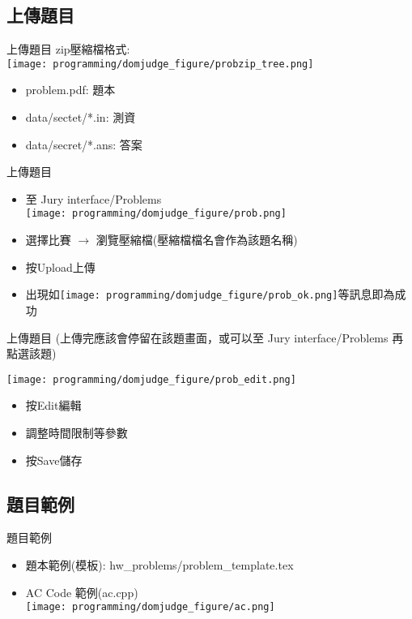 \documentclass[aspectratio=169,xcolor=dvipsnames]{beamer}
\begin{document}
    \subsection{上傳題目}
    \begin{frame}{上傳題目}
        zip壓縮檔格式: \\
        \texttt{[image: programming/domjudge\_figure/probzip\_tree.png]} \\
        \begin{itemize}
            \item problem.pdf: 題本
            \item data/sectet/*.in: 測資
            \item data/secret/*.ans: 答案
        \end{itemize}
    \end{frame}
    
    \begin{frame}{上傳題目}
        \begin{itemize}
            \item 至 Jury interface/Problems \\
            \texttt{[image: programming/domjudge\_figure/prob.png]}
            \item 選擇比賽 $\rightarrow$ 瀏覽壓縮檔(壓縮檔檔名會作為該題名稱)
            \item 按Upload上傳
            \item 出現如\texttt{[image: programming/domjudge\_figure/prob\_ok.png]}等訊息即為成功
        \end{itemize}
    \end{frame}
    
    \begin{frame}{上傳題目}
        (上傳完應該會停留在該題畫面，或可以至 Jury interface/Problems 再點選該題)\\
        \centerline{\texttt{[image: programming/domjudge\_figure/prob\_edit.png]}}
        \begin{itemize}
            \item 按Edit編輯
            \item 調整時間限制等參數
            \item 按Save儲存
        \end{itemize}
    \end{frame}
    
    \subsection{題目範例}
    \begin{frame}{題目範例}
        \begin{itemize}
            \item 題本範例(模板): hw\_problems/problem\_template.tex
            \item AC Code 範例(ac.cpp) \\
                \vspace{0.5em}
                \texttt{[image: programming/domjudge\_figure/ac.png]}
        \end{itemize}
    \end{frame}
    
\end{document}

